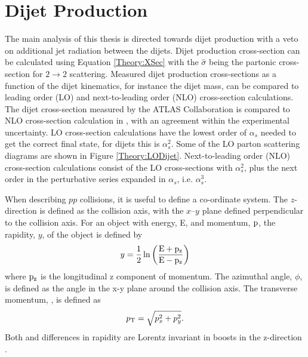 \section{Dijet Production}
\label{sec:Theory:Dijet}

The main analysis of this thesis is directed towards dijet production with a veto on additional jet radiation between the dijets.
Dijet production cross-section can be calculated using Equation \ref{Theory:XSec} with the $\hat{\sigma}$ being the partonic cross-section for $2\rightarrow 2$ scattering.
Measured dijet production cross-sections as a function of the dijet kinematics, for instance the dijet mass, can be compared to leading order (LO) and next-to-leading order (NLO) cross-section calculations.
The dijet cross-section measured by the ATLAS Collaboration is compared to NLO cross-section calculation in \cite{ref:Dijet}, with an agreement within the experimental uncertainty.
LO cross-section calculations have the lowest order of $\alpha_{s}$ needed to get the correct final state, for dijets this is $\alpha_{s}^{2}$.
Some of the LO parton scattering diagrams are shown in Figure \ref{Theory:LODijet}.
Next-to-leading order (NLO) cross-section calculations consist of the LO cross-sections with $\alpha_{s}^{2}$, plus the next order in the perturbative series expanded in $\alpha_{s}$, i.e. $\alpha_{s}^{3}$.


When describing $pp$ collisions, it is useful to define a co-ordinate system.
The $z$-direction is defined as the collision axis, with the $x$--$y$ plane defined perpendicular to the collision axis.
For an object with energy, E, and momentum, $\bold{\rm p}$, the rapidity, $y$, of the object is defined by
\begin{equation}
y=\frac{1}{2}\ln\left(\rm \frac{E+p_z}{E-p_z}\right)
\label{Theory:Rapidity}
\end{equation}
where $\rm p_{z}$ is the longitudinal z component of momentum. 
The azimuthal angle, $\phi$, is defined as the angle in the x-y plane around the collision axis.
The transverse momentum, \pt{}, is defined as
\begin{equation}
\mbox{$p_{\rm T}$}{}=\sqrt{ p_{x}^{2} +  p_{y}^{2}}.
\label{Theory:pt}
\end{equation}
Both \pt{} and differences in rapidity are Lorentz invariant in boosts in the z-direction \cite{ref:Rapidity}.  
 

